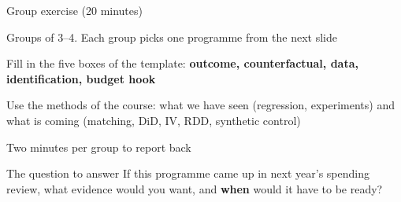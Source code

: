 \documentclass[aspectratio=169,xcolor=table]{beamer}
\begin{document}
\begin{frame}{Group exercise (20 minutes)}
\be
  \item Groups of 3--4. Each group picks one programme from the next slide
  \item Fill in the five boxes of the template: \textbf{outcome, counterfactual, data, identification, budget hook}
  \item Use the methods of the course: what we have seen (regression, experiments) and what is coming (matching, DiD, IV, RDD, synthetic control)
  \item Two minutes per group to report back
\ee
\begin{block}{The question to answer}
\centering If this programme came up in next year's spending review, what evidence would you want, and \textbf{when} would it have to be ready?
\end{block}
\end{frame}
\end{document}
